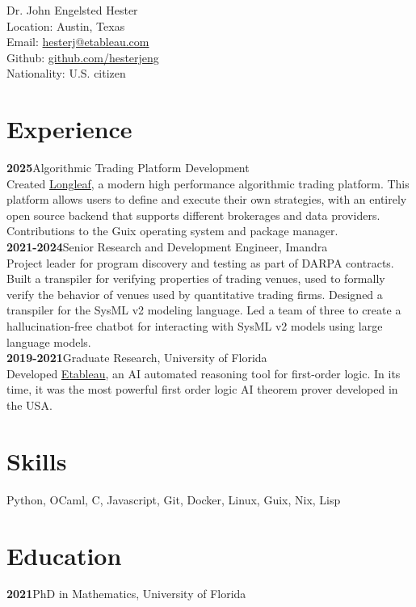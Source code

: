 \documentclass[10pt, letterpaper]{article}
\newcommand{\years}[1]{\textbf{#1}\hspace{1em}}
\begin{document}
{\LARGE Dr. John Engelsted Hester}\\[0.3cm]
Location: Austin, Texas\\
Email: \href{mailto:hesterj@etableau.com}{hesterj@etableau.com}\\
Github: \href{https://github.com/hesterjeng}{github.com/hesterjeng}\\
Nationality:  U.S. citizen

\section*{Experience}
\noindent
\years{2025}Algorithmic Trading Platform Development\\
Created \href{https://github.com/hesterjeng/longleaf}{Longleaf}, a modern high performance algorithmic trading platform.  This platform allows users to define and execute their own strategies, with an entirely open source backend that supports different brokerages and data providers.  Contributions to the Guix operating system and package manager.\\

\years{2021-2024}Senior Research and Development Engineer, Imandra\\
Project leader for program discovery and testing as part of DARPA contracts. Built a transpiler for verifying properties of trading venues, used to formally verify the behavior of venues used by quantitative trading firms. Designed a transpiler for the SysML v2 modeling language. Led a team of three to create a hallucination-free chatbot for interacting with SysML v2 models using large language models.\\

\years{2019-2021}Graduate Research, University of Florida\\
Developed \href{https://github.com/hesterj/Etableau}{Etableau}, an AI automated reasoning tool for first-order logic.  In its time, it was the most powerful first order logic AI theorem prover developed in the USA.

\section*{Skills}
Python, OCaml, C, Javascript, Git, Docker, Linux, Guix, Nix, Lisp

\section*{Education}
\noindent
\years{2021}PhD in Mathematics, University of Florida\\
\end{document}
